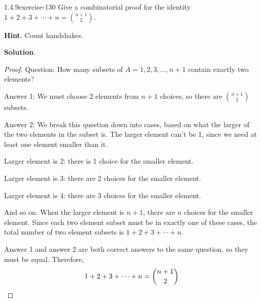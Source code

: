 \documentclass[twoside,11pt,]{book}
\renewcommand{\qedhere}{\relax}
\numberwithin{equation}{chapter}
\begin{document}
\begin{divisionsolution}{1.4.9}{}{exercise-130}%
\hypertarget{p-2125}{}%
Give a combinatorial proof for the identity \(1 + 2 + 3 + \cdots + n = {n+1 \choose 2}\).%
\par\smallskip%
\noindent\textbf{Hint}.\quad%
\hypertarget{p-2126}{}%
Count handshakes.%
\par\smallskip%
\noindent\textbf{Solution}.\quad%
\begin{proof}{}
\hypertarget{p-2127}{}%
Question: How many subsets of \(A = {1,2,3, \ldots,
n+1}\) contain exactly two elements?%
\par
\hypertarget{p-2128}{}%
Answer 1: We must choose 2 elements from \(n+1\) choices, so there are \({n+1 \choose 2}\) subsets.%
\par
\hypertarget{p-2129}{}%
Answer 2: We break this question down into cases, based on what the larger of the two elements in the subset is. The larger element can't be 1, since we need at least one element smaller than it.%
\par
\hypertarget{p-2130}{}%
Larger element is 2: there is 1 choice for the smaller element.%
\par
\hypertarget{p-2131}{}%
Larger element is 3: there are 2 choices for the smaller element.%
\par
\hypertarget{p-2132}{}%
Larger element is 4: there are 3 choices for the smaller element.%
\par
\hypertarget{p-2133}{}%
And so on. When the larger element is \(n+1\), there are \(n\) choices for the smaller element. Since each two element subset must be in exactly one of these cases, the total number of two element subsets is \(1 + 2 + 3 + \cdots + n\).%
\par
\hypertarget{p-2134}{}%
Answer 1 and answer 2 are both correct answers to the same question, so they must be equal. Therefore,%
\begin{equation*}
1 + 2 + 3 + \cdots + n = {n+1 \choose 2}\qedhere
\end{equation*}
%
\end{proof}
\end{divisionsolution}%
\end{document}
